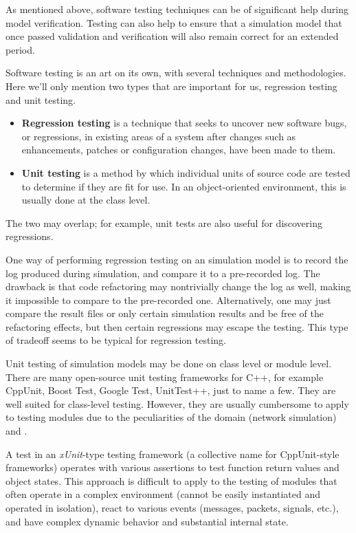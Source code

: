 As mentioned above, software testing techniques can be of significant help
during model verification. Testing can also help to ensure that
a simulation model that once passed validation and verification will also
remain correct for an extended period.

Software testing is an art on its own, with several techniques and
methodologies. Here we'll only mention two types that are important for us,
regression testing and unit testing.

\begin{itemize}
\item \textbf{Regression testing} is a technique that seeks to uncover new
    software bugs, or regressions, in existing areas of a system after changes
    such as enhancements, patches or configuration changes, have been made to
    them.
\item \textbf{Unit testing} is a method by which individual units of
    source code are tested to determine if they are fit for use. In an
    object-oriented environment, this is usually done at the class level.
\end{itemize}

The two may overlap; for example, unit tests are also useful for discovering
regressions.

One way of performing regression testing on an {\opp} simulation model is
to record the log produced during simulation, and compare it to a
pre-recorded log. The drawback is that code refactoring may nontrivially
change the log as well, making it impossible to compare to the pre-recorded
one. Alternatively, one may just compare the result files or only certain
simulation results and be free of the refactoring effects, but then certain
regressions may escape the testing. This type of tradeoff seems to be
typical for regression testing.

Unit testing of simulation models may be done on class level or module
level. There are many open-source unit testing frameworks for C++, for
example CppUnit, Boost Test, Google Test, UnitTest++, just to name a few.
They are well suited for class-level testing. However, they are usually
cumbersome to apply to testing modules due to the peculiarities of the
domain (network simulation) and {\opp}.

A test in an \textit{xUnit}-type testing framework (a collective name for
CppUnit-style frameworks) operates with various assertions to test
function return values and object states. This approach is difficult to
apply to the testing of {\opp} modules that often operate in a complex
environment (cannot be easily instantiated and operated in isolation),
react to various events (messages, packets, signals, etc.), and have
complex dynamic behavior and substantial internal state.

